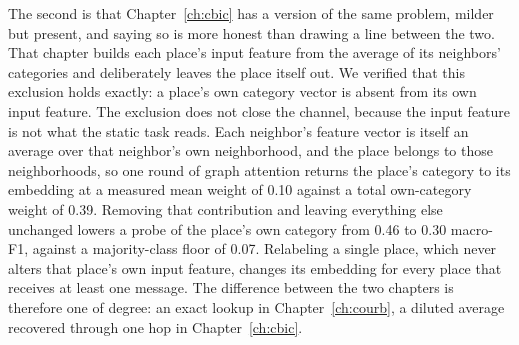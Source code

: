 The second is that Chapter~\ref{ch:cbic} has a version of the same problem, milder but present, and
saying so is more honest than drawing a line between the two. That chapter builds each place's input
feature from the average of its neighbors' categories and deliberately leaves the place itself out.
We verified that this exclusion holds exactly: a place's own category vector is absent from its own
input feature. The exclusion does not close the channel, because the input feature is not what the
static task reads. Each neighbor's feature vector is itself an average over that neighbor's own
neighborhood, and the place belongs to those neighborhoods, so one round of graph attention returns
the place's category to its embedding at a measured mean weight of 0.10 against a total own-category
weight of 0.39. Removing that contribution and leaving everything else unchanged lowers a probe of
the place's own category from 0.46 to 0.30 macro-F1, against a majority-class floor of 0.07.
Relabeling a single place, which never alters that place's own input feature, changes its embedding
for every place that receives at least one message. The difference between the two chapters is
therefore one of degree: an exact lookup in Chapter~\ref{ch:courb}, a diluted average recovered
through one hop in Chapter~\ref{ch:cbic}.

